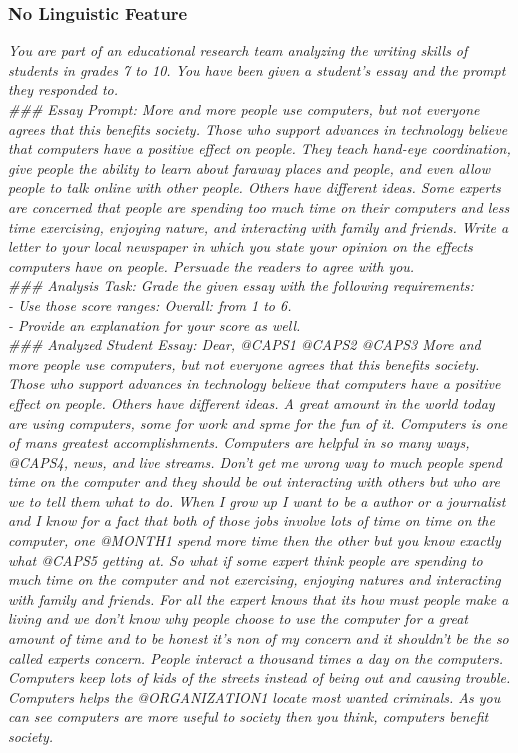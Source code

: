\subsubsection{No Linguistic Feature}
\textit{
You are part of an educational research team analyzing the writing skills of students in grades 7 to 10. You have been given a student's essay and the prompt they responded to.  \\
\#\#\# Essay Prompt: More and more people use computers, but not everyone agrees that this benefits society. Those who support advances in technology believe that computers have a positive effect on people. They teach hand-eye coordination, give people the ability to learn about faraway places and people, and even allow people to talk online with other people. Others have different ideas. Some experts are concerned that people are spending too much time on their computers and less time exercising, enjoying nature, and interacting with family and friends. Write a letter to your local newspaper in which you state your opinion on the effects computers have on people. Persuade the readers to agree with you.  \\
}
\textit{
\#\#\# Analysis Task: Grade the given essay with the following requirements:  \\
- Use those score ranges: Overall: from 1 to 6.  \\
- Provide an explanation for your score as well.  \\
}
\textit{
\#\#\# Analyzed Student Essay: Dear, @CAPS1 @CAPS2 @CAPS3 More and more people use computers, but not everyone agrees that this benefits society. Those who support advances in technology believe that computers have a positive effect on people. Others have different ideas. A great amount in the world today are using computers, some for work and spme for the fun of it. Computers is one of mans greatest accomplishments. Computers are helpful in so many ways, @CAPS4, news, and live streams. Don't get me wrong way to much people spend time on the computer and they should be out interacting with others but who are we to tell them what to do. When I grow up I want to be a author or a journalist and I know for a fact that both of those jobs involve lots of time on time on the computer, one @MONTH1 spend more time then the other but you know exactly what @CAPS5 getting at. So what if some expert think people are spending to much time on the computer and not exercising, enjoying natures and interacting with family and friends. For all the expert knows that its how must people make a living and we don't know why people choose to use the computer for a great amount of time and to be honest it's non of my concern and it shouldn't be the so called experts concern. People interact a thousand times a day on the computers. Computers keep lots of kids of the streets instead of being out and causing trouble. Computers helps the @ORGANIZATION1 locate most wanted criminals. As you can see computers are more useful to society then you think, computers benefit society. \\
}
